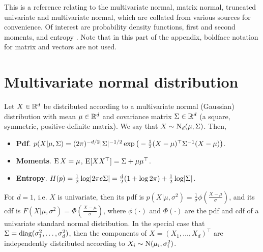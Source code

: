 This is a reference relating to the multivariate normal,  matrix normal, truncated univariate and multivariate normal, which are collated from various sources for convenience.
Of interest are probability density functions, first and second moments, and entropy .
Note that in this part of the appendix, boldface notation for matrix and vectors are not used.

\section{Multivariate normal distribution}

\begin{definition}
  Let $X\in\bbR^d$ be distributed according to a multivariate normal (Gaussian) distribution with mean $\mu \in \bbR^d$ and covariance matrix $\Sigma \in\bbR^d$ (a square, symmetric, positive-definite matrix).
  We say that $X\sim\N_d(\mu,\Sigma)$.
  Then,
  \begin{itemize}
    \item \textbf{Pdf}. $p(X|\mu,\Sigma) = (2\pi)^{-d/2}|\Sigma|^{-1/2}\exp\big(-\half (X-\mu)^\top\Sigma^{-1}(X-\mu)\big)$.
    \item \textbf{Moments}. $\E X=\mu$, $\E [XX^\top] = \Sigma + \mu \mu^\top$.
    \item \textbf{Entropy}. $H(p) = \half \log \abs{2\pi e \Sigma} = \half[d](1 + \log 2\pi) + \half\log\abs{\Sigma}$.
  \end{itemize}
\end{definition}

For $d=1$, i.e. $X$ is univariate, then its pdf is $p(X|\mu,\sigma^2) = \frac{1}{\sigma}\phi \left( \frac{X-\mu}{\sigma} \right)$, and its cdf is $F(X|\mu,\sigma^2) = \Phi \left( \frac{X-\mu}{\sigma} \right)$, where $\phi(\cdot)$ and $\Phi(\cdot)$ are the pdf and cdf of a univariate standard normal distribution.
In the special case that $\Sigma = \diag(\sigma_1^2,\dots,\sigma_d^2)$, then the components of $X=(X_1,\dots,X_d)^\top$ are independently distributed according to $X_i\sim\N(\mu_i,\sigma_i^2)$.

